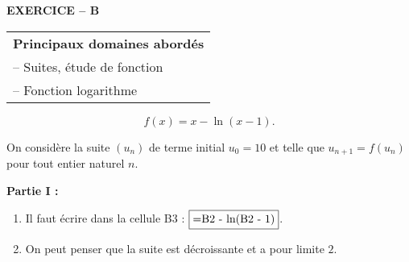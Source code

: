 \textbf{EXERCICE -- B}

\medskip

\begin{tabular}{|l|}\hline
\textbf{Principaux domaines abordés}\\
-- Suites, étude de fonction\\
-- Fonction logarithme\\ \hline
\end{tabular}

\medskip


\[f(x) = x - \ln (x - 1).\]

On considère la suite $\left(u_n\right)$ de terme initial $u_0 = 10$ et telle que $u_{n+1} = f\left(u_n\right)$ pour tout entier naturel $n$.

\bigskip

\textbf{Partie I :}

\medskip

%
%

\begin{enumerate}
\item %
Il faut écrire dans la cellule B3 : $\fbox{=B2 - ln(B2 - 1)}$.
\item %
On peut penser que la suite est décroissante et a pour limite $2$.
\end{enumerate}

